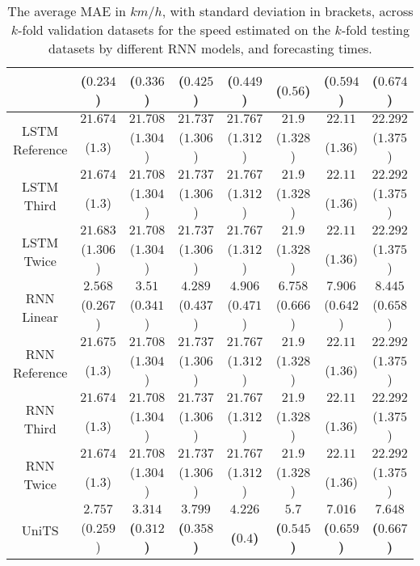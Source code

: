 \begin{table}[!ht]
{\begin{tabular}{|c|c|c|c|c|c|c|c|}
			 & \textbf{(}$\mathbf{0.234}$\textbf{)} & ($0.336$) & ($0.425$) & ($0.449$) & ($0.56$) & ($0.594$) & ($0.674$) \\ \hline
			\multirow{2}{*}{LSTM Reference} & $21.674$ & $21.708$ & $21.737$ & $21.767$ & $21.9$ & $22.11$ & $22.292$ \\
			 & ($1.3$) & ($1.304$) & ($1.306$) & ($1.312$) & ($1.328$) & ($1.36$) & ($1.375$) \\ \hline
			\multirow{2}{*}{LSTM Third} & $21.674$ & $21.708$ & $21.737$ & $21.767$ & $21.9$ & $22.11$ & $22.292$ \\
			 & ($1.3$) & ($1.304$) & ($1.306$) & ($1.312$) & ($1.328$) & ($1.36$) & ($1.375$) \\ \hline
			\multirow{2}{*}{LSTM Twice} & $21.683$ & $21.708$ & $21.737$ & $21.767$ & $21.9$ & $22.11$ & $22.292$ \\
			 & ($1.306$) & ($1.304$) & ($1.306$) & ($1.312$) & ($1.328$) & ($1.36$) & ($1.375$) \\ \hline
			\multirow{2}{*}{RNN Linear} & $2.568$ & $3.51$ & $4.289$ & $4.906$ & $6.758$ & $7.906$ & $8.445$ \\
			 & ($0.267$) & ($0.341$) & ($0.437$) & ($0.471$) & ($0.666$) & ($0.642$) & ($0.658$) \\ \hline
			\multirow{2}{*}{RNN Reference} & $21.675$ & $21.708$ & $21.737$ & $21.767$ & $21.9$ & $22.11$ & $22.292$ \\
			 & ($1.3$) & ($1.304$) & ($1.306$) & ($1.312$) & ($1.328$) & ($1.36$) & ($1.375$) \\ \hline
			\multirow{2}{*}{RNN Third} & $21.674$ & $21.708$ & $21.737$ & $21.767$ & $21.9$ & $22.11$ & $22.292$ \\
			 & ($1.3$) & ($1.304$) & ($1.306$) & ($1.312$) & ($1.328$) & ($1.36$) & ($1.375$) \\ \hline
			\multirow{2}{*}{RNN Twice} & $21.674$ & $21.708$ & $21.737$ & $21.767$ & $21.9$ & $22.11$ & $22.292$ \\
			 & ($1.3$) & ($1.304$) & ($1.306$) & ($1.312$) & ($1.328$) & ($1.36$) & ($1.375$) \\ \hline
			\multirow{2}{*}{UniTS} & $2.757$ & $\mathbf{3.314}$ & $\mathbf{3.799}$ & $\mathbf{4.226}$ & $\mathbf{5.7}$ & $\mathbf{7.016}$ & $\mathbf{7.648}$ \\
			 & ($0.259$) & \textbf{(}$\mathbf{0.312}$\textbf{)} & \textbf{(}$\mathbf{0.358}$\textbf{)} & \textbf{(}$\mathbf{0.4}$\textbf{)} & \textbf{(}$\mathbf{0.545}$\textbf{)} & \textbf{(}$\mathbf{0.659}$\textbf{)} & \textbf{(}$\mathbf{0.667}$\textbf{)} \\ \hline
		\end{tabular}
	}
	\caption{The average MAE in $km/h$, with standard deviation in brackets, across $k$-fold validation datasets for the speed estimated on the $k$-fold testing datasets by different RNN models, and forecasting times.}
	\label{tab:all_speed_MAE}
\end{table}